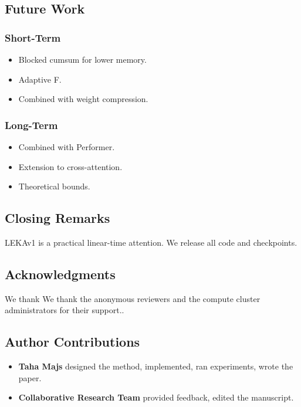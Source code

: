 \subsection{Future Work}

\subsubsection{Short-Term}
\begin{itemize}
\item Blocked cumsum for lower memory.
\item Adaptive F.
\item Combined with weight compression.

\end{itemize}
\subsubsection{Long-Term}
\begin{itemize}
\item Combined with Performer.
\item Extension to cross-attention.
\item Theoretical bounds.

\end{itemize}
\subsection{Closing Remarks}

LEKAv1 is a practical linear-time attention. We release all code and 
checkpoints.

\subsection{Acknowledgments}

We thank We thank the anonymous reviewers and the compute cluster administrators for their support..

\subsection{Author Contributions}

\begin{itemize}
\item \textbf{Taha Majs} designed the method, implemented, ran experiments,
  wrote the paper.
\item \textbf{Collaborative Research Team} provided feedback, edited the manuscript.

\end{itemize}
